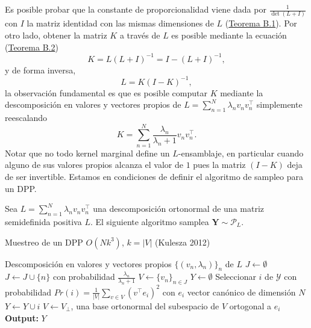 \vspace{0.2cm}

Es posible probar que la constante de proporcionalidad viene dada por $\frac{1}{\det(L + I)}$ con $I$ la matriz identidad con las mismas dimensiones de $L$ (\hyperlink{Teorema B.1}{Teorema B.1}). Por otro lado, obtener la matriz $K$ a través de $L$ es posible mediante la ecuación (\hyperlink{Teorema B.2}{Teorema B.2})
\[
K = L(L+I)^{-1} = I - (L+I)^{-1} , 
\]
y de forma inversa, 
\[
L = K(I-K)^{-1} , 
\]
la observación fundamental es que es posible computar $K$ mediante la descomposición en valores y vectores propios de $L = \sum_{n=1}^{N} \lambda_nv_n v^{\top}_n$ simplemente reescalando 
\[
K = \sum_{n=1}^{N}\frac{\lambda_n}{\lambda_n + 1}v_n v^{\top}_n .
\]
Notar que no todo kernel marginal define un $L$-ensamblaje, en particular cuando alguno de sus valores propios alcanza el valor de $1$ pues la matriz $(I-K)$ deja de ser invertible. Estamos en condiciones de definir el algoritmo de sampleo para un DPP.

\begin{teo}
Sea $L = \sum_{n=1}^N \lambda_n v_n v_{n}^{\top}$ una descomposición ortonormal de una matriz semidefinida positiva $L$. El siguiente algoritmo samplea $\mathbf{Y} \sim \mathcal{P}_L$.

\begin{algorithm}
\caption{Muestreo de un DPP $O(Nk^3)$, $k = |V|$ (Kulesza 2012)}\label{alg:alg1}
\begin{algorithmic}
\Require Descomposición en valores y vectores propios 
$\{(v_n , \lambda_n)\}_{n}$ de $L$
\State $J \gets \emptyset$
\State $J \gets J \cup \{n\}$ con probabilidad $\frac{\lambda_n}{\lambda_n+1}$
\EndFor
\State $V \gets \{ v_n \}_{n \in J}$
\State $Y \gets \emptyset$
\State Seleccionar $i$ de $\mathcal{Y}$ con probabilidad $Pr(i) = \frac{1}{|V|}\sum_{v \in V}(v^{\top}e_i)^2$ con $e_i$ vector canónico de dimensión $N$                                                                               
\State $Y \gets Y \cup i$
\State $V \gets V_{\perp}$, una base ortonormal del subespacio de $V$ ortogonal a $e_i$ 
\EndWhile   
\State \textbf{Output: } $Y$
\end{algorithmic}
\end{algorithm}
\end{teo}

